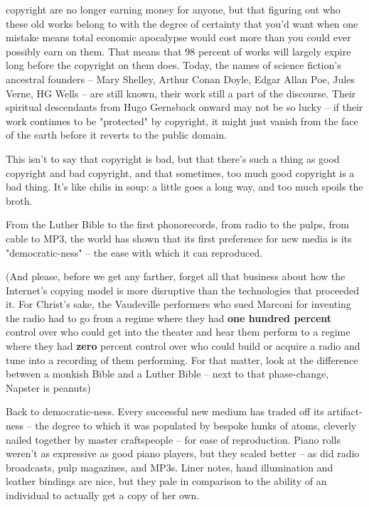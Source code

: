 \begin{itemize}
  copyright are no longer earning money for anyone, but that figuring
  out who these old works belong to with the degree of certainty that
  you'd want when one mistake means total economic apocalypse would
  cost more than you could ever possibly earn on them. That means
  that 98 percent of works will largely expire long before the
  copyright on them does. Today, the names of science fiction's
  ancestral founders -- Mary Shelley, Arthur Conan Doyle, Edgar Allan
  Poe, Jules Verne, HG Wells -- are still known, their work still a
  part of the discourse. Their spiritual descendants from Hugo
  Gernsback onward may not be so lucky -- if their work continues to
  be "protected" by copyright, it might just vanish from the face of
  the earth before it reverts to the public domain.
\end{itemize}
This isn't to say that copyright is bad, but that there's such a
thing as good copyright and bad copyright, and that sometimes, too
much good copyright is a bad thing. It's like chilis in soup: a
little goes a long way, and too much spoils the broth.

From the Luther Bible to the first phonorecords, from radio to the
pulps, from cable to MP3, the world has shown that its first
preference for new media is its "democratic-ness" -- the ease with
which it can reproduced.

(And please, before we get any farther, forget all that business
about how the Internet's copying model is more disruptive than the
technologies that proceeded it. For Christ's sake, the Vaudeville
performers who sued Marconi for inventing the radio had to go from
a regime where they had \textbf{one hundred percent} control over
who could get into the theater and hear them perform to a regime
where they had \textbf{zero} percent control over who could build
or acquire a radio and tune into a recording of them performing.
For that matter, look at the difference between a monkish Bible and
a Luther Bible -- next to that phase-change, Napster is peanuts)

Back to democratic-ness. Every successful new medium has traded off
its artifact-ness -- the degree to which it was populated by
bespoke hunks of atoms, cleverly nailed together by master
craftspeople -- for ease of reproduction. Piano rolls weren't as
expressive as good piano players, but they scaled better -- as did
radio broadcasts, pulp magazines, and MP3s. Liner notes, hand
illumination and leather bindings are nice, but they pale in
comparison to the ability of an individual to actually get a copy
of her own.

